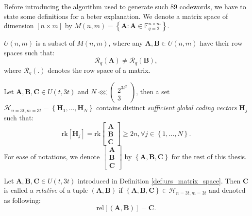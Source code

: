 Before introducing the algorithm used to generate such 89 codewords,
we have to state some definitions for a beter explanation. We denote
a matrix space of dimension $\left[n\times m\right]$ by $M(n,m)=\left\{ \boldsymbol{A}:\boldsymbol{A}\in\ensuremath{\mathbb{F}}_{q=2}^{n\times m}\right\} $.
\begin{defn}
 $U(n,m)$ is a subset of $M(n,m)$, where any $\boldsymbol{A},\boldsymbol{B}\in U(n,m)$
have their row spaces such that:
\[
\mathcal{R}_{q}\left(\boldsymbol{A}\right)\neq\mathcal{R}_{q}\left(\boldsymbol{B}\right),
\]
where $\mathcal{R}_{q}\left(.\right)$ denotes the row space of a
matrix.
\end{defn}
%
\begin{defn}
 Let $\boldsymbol{A},\boldsymbol{B},\boldsymbol{C}\in U(t,3t)$ and
$N\lll\left(\begin{array}{c}
2^{3t^{2}}\\
3
\end{array}\right)$, then a set $\mathcal{H}_{n=3t,m=3t}=\left\{ \boldsymbol{H}_{1},\ldots,\boldsymbol{H}_{N}\right\} $
contains distinct \textit{sufficient global coding vectors} $\boldsymbol{H}_{j}$
such that:
\[
\mathrm{rk}\left[\boldsymbol{H}_{j}\right]=\mathrm{rk}\left[\begin{array}{c}
\boldsymbol{A}\\
\boldsymbol{B}\\
\boldsymbol{C}
\end{array}\right]\geq2n,\forall j\in\left\{ 1,\ldots,N\right\} .
\]
For ease of notations, we denote $\left[\begin{array}{c}
\boldsymbol{A}\\
\boldsymbol{B}\\
\boldsymbol{C}
\end{array}\right]$ by $\left\{ \boldsymbol{A},\boldsymbol{B},\boldsymbol{C}\right\} $
for the rest of this thesis.
\end{defn}
%
\begin{defn}[Relative]
 Let $\boldsymbol{A},\boldsymbol{B},\boldsymbol{C}\in U(t,3t)$ introduced
in Definition \ref{def:urs_matrix_space}. Then $\boldsymbol{C}$
is called a \textit{relative} of a tuple $\left(\boldsymbol{A},\boldsymbol{B}\right)$
if $\left\{ \boldsymbol{A},\boldsymbol{B},\boldsymbol{C}\right\} \in\mathcal{H}_{n=3t,m=3t}$
and denoted as following:
\[
\mathrm{rel}\left[\left(\boldsymbol{A},\boldsymbol{B}\right)\right]=\boldsymbol{C}.
\]
\end{defn}
